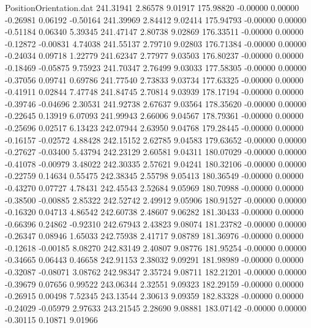 \begin{filecontents}{PositionOrientation.dat}
 241.31941    2.86578    9.01917   175.98820   -0.00000    0.00000   -0.26981    0.06192   -0.50164
 241.39969    2.84412    9.02414   175.94793   -0.00000    0.00000   -0.51184    0.06340    5.39345
 241.47147    2.80738    9.02869   176.33511   -0.00000    0.00000   -0.12872   -0.00831    4.74038
 241.55137    2.79710    9.02803   176.71384   -0.00000    0.00000   -0.24034    0.09718    1.22779
 241.62347    2.77977    9.03503   176.80237   -0.00000    0.00000   -0.18469   -0.05875    9.75923
 241.70347    2.76499    9.03033   177.58305   -0.00000    0.00000   -0.37056    0.09741    0.69786
 241.77540    2.73833    9.03734   177.63325   -0.00000    0.00000   -0.41911    0.02844    7.47748
 241.84745    2.70814    9.03939   178.17194   -0.00000    0.00000   -0.39746   -0.04696    2.30531
 241.92738    2.67637    9.03564   178.35620   -0.00000    0.00000   -0.22645    0.13919    6.07093
 241.99943    2.66006    9.04567   178.79361   -0.00000    0.00000   -0.25696    0.02517    6.13423
 242.07944    2.63950    9.04768   179.28445   -0.00000    0.00000   -0.16157   -0.02572    4.88428
 242.15152    2.62785    9.04583   179.63652   -0.00000    0.00000   -0.27627   -0.03400    5.43794
 242.23129    2.60581    9.04311   180.07029   -0.00000    0.00000   -0.41078   -0.00979    3.48022
 242.30335    2.57621    9.04241   180.32106   -0.00000    0.00000   -0.22759    0.14634    0.55475
 242.38345    2.55798    9.05413   180.36549   -0.00000    0.00000   -0.43270    0.07727    4.78431
 242.45543    2.52684    9.05969   180.70988   -0.00000    0.00000   -0.38500   -0.00885    2.85322
 242.52742    2.49912    9.05906   180.91527   -0.00000    0.00000   -0.16320    0.04713    4.86542
 242.60738    2.48607    9.06282   181.30433   -0.00000    0.00000   -0.66396    0.24862   -0.92310
 242.67943    2.43823    9.08074   181.23782   -0.00000    0.00000   -0.26347    0.08946    1.65033
 242.75938    2.41717    9.08789   181.36976   -0.00000    0.00000   -0.12618   -0.00185    8.08270
 242.83149    2.40807    9.08776   181.95254   -0.00000    0.00000   -0.34665    0.06443    0.46658
 242.91153    2.38032    9.09291   181.98989   -0.00000    0.00000   -0.32087   -0.08071    3.08762
 242.98347    2.35724    9.08711   182.21201   -0.00000    0.00000   -0.39679    0.07656    0.99522
 243.06344    2.32551    9.09323   182.29159   -0.00000    0.00000   -0.26915    0.00498    7.52345
 243.13544    2.30613    9.09359   182.83328   -0.00000    0.00000   -0.24029   -0.05979    2.97633
 243.21545    2.28690    9.08881   183.07142   -0.00000    0.00000   -0.30115    0.10871    9.01966

\end{filecontents}
